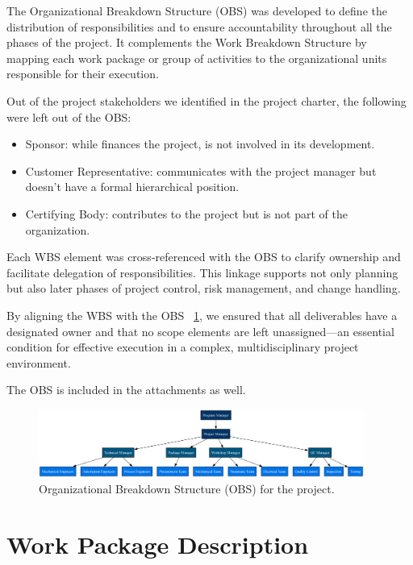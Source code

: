 \documentclass[12pt]{article}
\begin{document}
The Organizational Breakdown Structure (OBS) was developed to define the distribution of responsibilities and to ensure accountability throughout all the phases of the project. It complements the Work Breakdown Structure by mapping each work package or group of activities to the organizational units responsible for their execution.

Out of the project stakeholders we identified in the project charter, the following were left out of the OBS:
\begin{itemize}
        \item Sponsor: while finances the project, is not involved in its development.
        \item Customer Representative: communicates with the project manager but doesn't have a formal hierarchical position.
        \item Certifying Body: contributes to the project but is not part of the organization.
\end{itemize}

Each WBS element was cross-referenced with the OBS to clarify ownership and facilitate delegation of responsibilities. This linkage supports not only planning but also later phases of project control, risk management, and change handling.

By aligning the WBS with the OBS ~\ref{fig:obs}, we ensured that all deliverables have a designated owner and that no scope elements are left unassigned—an essential condition for effective execution in a complex, multidisciplinary project environment.

The OBS is included in the attachments as well.

\begin{figure}[H]
        \centering
        \includegraphics[width=0.95\textwidth]{../OBS.png}
        \caption{Organizational Breakdown Structure (OBS) for the project.}
        \label{fig:obs}
\end{figure}

\section{Work Package Description}
\end{document}
